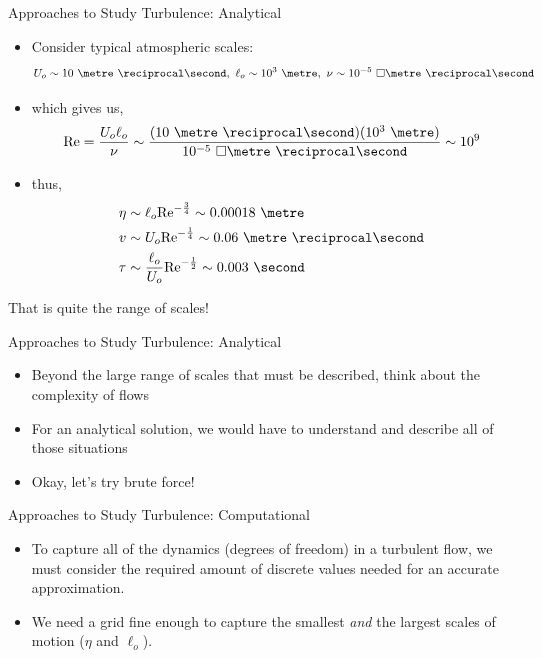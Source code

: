 \begin{frame}{Approaches to Study Turbulence: Analytical}
\begin{itemize}
	\item Consider typical atmospheric scales:$$U_o\sim10\ \metre\ \reciprocal\second,\ \ell_o\sim10^3\ \metre,\ \nu \sim 10^{-5}\ \square\metre\ \reciprocal\second$$
	\item which gives us, $$\text{Re} = \frac{U_o \ell_o}{\nu} \sim \frac{(10\ \metre\ \reciprocal\second)(10^3\ \metre)}{10^{-5}\ \square\metre\ \reciprocal\second} \sim 10^9$$
	\item thus, 
	\begin{align*}
		\eta &\sim \ell_o \text{Re}^{-\frac{3}{4}} \sim 0.00018\ \metre \\
		v &\sim U_o \text{Re}^{-\frac{1}{4}} \sim 0.06\ \metre\ \reciprocal\second \\
		\tau &\sim \frac{\ell_o}{U_o} \text{Re}^{-\frac{1}{2}} \sim 0.003\ \second
	\end{align*}
\end{itemize}
That is quite the range of scales!	
\end{frame}


\begin{frame}{Approaches to Study Turbulence: Analytical}
\begin{itemize}
	\item Beyond the large range of scales that must be described, think about the complexity of flows
	\item For an analytical solution, we would have to understand and describe all of those situations
	\item Okay, let's try brute force!
\end{itemize}
\end{frame}


\begin{frame}{Approaches to Study Turbulence: Computational}

\begin{itemize}
	\item To capture all of the dynamics (degrees of freedom) in a turbulent flow, we must consider the required amount of discrete values needed for an accurate approximation.
	\item We need a grid fine enough to capture the smallest \textit{and} the largest scales of motion ($\eta$ and $\ell_o$).
\end{itemize}
\end{frame}

